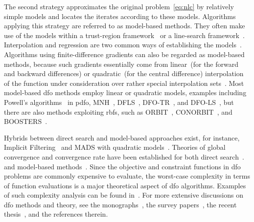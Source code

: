 \documentclass[
    smallextended,  %
    final,          %
]{svjour3}
\begin{document}
The second strategy approximates the original problem~\eqref{eq:nlc} by relatively simple models and locates the iterates according to these models.
Algorithms applying this strategy are referred to as model-based methods. They often make use of the models within a trust-region framework~\cite{Conn_Scheinberg_Vicente_2009a} or a line-search framework~\cite{Berahas_Byrd_Nocedal_2019}.
Interpolation and regression are two common ways of establishing the models~\cite{Powell_2001,Conn_Scheinberg_Vicente_2008a,Conn_Scheinberg_Vicente_2008b,Wild_Regis_Shoemaker_2008,Bandeira_Scheinberg_Vicente_2012,Billups_Larson_Graf_2013,Regis_Wild_2017}.
Algorithms using finite-difference gradients can also be regarded as model-based
methods, because such gradients essentially come from linear~(for the forward and backward
differences) or quadratic~(for the central difference) interpolation of the function under
consideration over rather special interpolation sets~\cite[\S~1.4.3]{Ragonneau_2022}.
Most model-based \gls{dfo} methods employ linear or quadratic models, examples including
Powell's algorithms~\cite{Powell_1994,Powell_2002,Powell_2006,Powell_2009} in \gls{pdfo},
MNH~\cite{Wild_2008}, DFLS~\cite{Zhang_Conn_Scheinberg_2010},
DFO-TR~\cite{Bandeira_Scheinberg_Vicente_2012}, and DFO-LS~\cite{Cartis_Etal_2019,Hough_Roberts_2022},
but there are also methods exploiting \glspl{rbf}, such as ORBIT~\cite{Wild_Regis_Shoemaker_2008}, CONORBIT~\cite{Regis_Wild_2017}, and BOOSTERS~\cite{Oeuvray_Bierlaire_2009}.

Hybrids between direct search and model-based approaches exist, for
instance, Implicit Filtering~\cite[Algorithm~4.7]{Kelley_2011} and MADS with quadratic models~\cite{Conn_LeDigabel_2013}.
Theories of global convergence and convergence rate have been established for both
direct search~\cite{Torczon_1997,Kolda_Lewis_Torczon_2003,Vicente_2013,Gratton_Etal_2015,Dodangeh_Vicente_2016}.
and model-based methods~\cite{Conn_Scheinberg_Toint_1997a,Conn_Scheinberg_Vicente_2009a,Powell_2012,Garmanjani_Judice_Vicente_2016}.
Since the objective and constraint functions in \gls{dfo} problems are commonly expensive to
evaluate, the worst-case complexity in terms of function evaluations is a major theoretical aspect of \gls{dfo} algorithms.
Examples of such complexity analysis can be found in~\cite{Vicente_2013,Gratton_Etal_2015,Dodangeh_Vicente_2016,Garmanjani_Judice_Vicente_2016}.
For more extensive discussions on \gls{dfo} methods and theory, see the monographs~\cite{Conn_Scheinberg_Vicente_2009b,Audet_Hare_2017}, the survey
papers~\cite{Rios_Sahinidis_2013,Custodio_Scheinberg_Vicente_2017,Larson_Menickelly_Wild_2019}, the recent thesis~\cite{Ragonneau_2022}, and the references therein.
\end{document}

